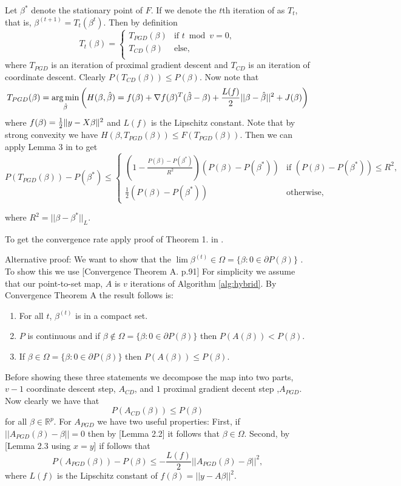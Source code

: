 Let $\beta^*$ denote the stationary point of $F$.
If we denote the $t$th iteration of  as $T_t$, that is, $\beta^{(t+1)} = T_t(\beta^{t})$. Then by definition
$$
T_t(\beta)=\begin{cases}
T_{PGD}(\beta) & \mbox{if } t\bmod v=0, \\
T_{CD}(\beta) & \mbox{else,}  \\
\end{cases}
$$
where $T_{PGD}$ is an iteration of proximal gradient descent and $T_{CD}$ is an iteration of coordinate descent. Clearly $P(T_{CD}(\beta)) \leq P(\beta)$. Now note that
$$
T_{PGD}(\beta)= \operatorname*{arg\,min}_{\hat{\beta}} \left( H(\beta,\hat{\beta}) = f(\beta) + \nabla f(\beta)^T (\hat{\beta} - \beta) + \frac{L(f)}{2} ||\beta-\hat{\beta}  ||^2+ J(\beta) \right)
$$ 
where $f(\beta) = \frac{1}{2} \lVert {y - X \beta} \rVert^2$ and $L(f)$ is the Lipschitz constant. Note that by strong convexity we have $H(\beta,T_{PGD}(\beta)) \leq F(T_{PGD}(\beta))$.
Then we can apply Lemma 3 in \textcite{richtarik2014}
to get
$$
P(T_{PGD}(\beta)) - P(\beta^*)  \leq 
\begin{cases}
\left(1 - \frac{P(\beta) - P(\beta^*)}{R^2} \right) \left( P(\beta) - P(\beta^*)\right) & \mbox{if } \left( P(\beta) - P(\beta^*) \right)\leq R^2, \\
\frac{1}{2}\left( P(\beta) - P(\beta^*)\right) & \mbox{otherwise,}
\end{cases}
$$


where $R^2=||\beta- \beta^*||_L$.

To get the convergence rate apply proof of Theorem 1. in \cite{richtarik2014iteration}.

Alternative proof:
We want to show that the $\lim \beta^{(t)} \in \Omega = \{\beta:0 \in \partial P(\beta)\}$ . To show this we use \cite{Zangwill}[Convergence Theorem A. p.91] For simplicity we assume that our point-to-set map, $A$ is $v$ iterations of Algorithm \ref{alg:hybrid}.  By  Convergence Theorem A the result follows is:
\begin{enumerate}
\item For all $t$, $\beta^{(t)}$ is in a compact set.
\item $P$ is continuous and if $\beta \notin \Omega = \{\beta:0 \in \partial P(\beta)\}$ then
$
P(A(\beta)) < 
P(\beta).
$
\item If $\beta  \in \Omega =\{\beta:0 \in \partial P(\beta)\}$ then 
$
P(A(\beta)) \leq 
P(\beta).
$
\end{enumerate}
Before showing these three statements we decompose the map into two parts, $v-1$ coordinate descent step, $A_{CD}$, and $1$ proximal gradient decent step ,$A_{PGD}$. Now clearly we have that $$P(A_{CD}(\beta)) \leq P(\beta)$$ for all $\beta \in \mathbb{R}^p$. For $A_{PGD}$ we have two useful properties: First, if $||A_{PGD}(\beta) - \beta||=0$ then by \cite{beck2009}[Lemma 2.2] it follows that $\beta \in \Omega$. Second,  by \cite{beck2009}[Lemma 2.3 using $x=y$] if follows that $$P(A_{PGD}(\beta)) - P(\beta) \leq  - \frac{L(f)}{2}||A_{PGD}(\beta) - \beta||^2,$$ where $L(f)$ is the Lipschitz constant of $f(\beta)= ||y-A\beta||^2$.

